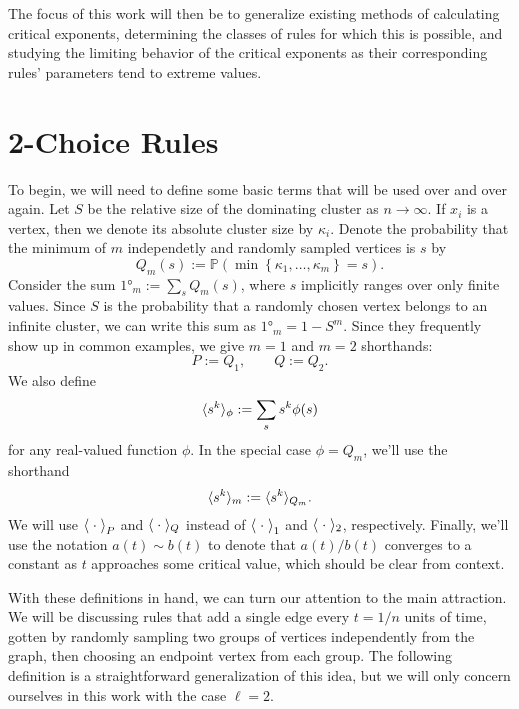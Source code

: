\documentclass[twoside,10pt]{article}
\begin{document}
The focus of this work will then be to generalize existing methods of calculating critical exponents, determining the classes of rules for which this is possible, and studying the limiting behavior of the critical exponents as their corresponding rules' parameters tend to extreme values.

\section{2-Choice Rules}

To begin, we will need to define some basic terms that will be used over and over again. Let $S$ be the relative size of the dominating cluster as $n \to \infty$. If $x_i$ is a vertex, then we denote its absolute cluster size by $\kappa_i$. Denote the probability that the minimum of $m$ independetly and randomly sampled vertices is $s$ by
\[
        Q_m(s) := \mathbb{P}\left( \min\left\{ \kappa_1, \dots, \kappa_m \right\} = s \right) .
\]
Consider the sum $\ang{1}_{m} := \sum_{s} Q_{m}(s)$, where $s$ implicitly ranges over only finite values. Since $S$ is the probability that a randomly chosen vertex belongs to an infinite cluster, we can write this sum as $\ang{1}_{m} = 1-S^{m}$. Since they frequently show up in common examples, we give $m=1$ and $m=2$ shorthands:
\[
        P := Q_1, \quad\quad Q := Q_2.
\]
We also define
\[
	\langle s^{k} \rangle_{\phi} := \sum_{s} s^{k} \phi(s)
\] 
for any real-valued function $\phi$. In the special case $\phi = Q_{m}$, we'll use the shorthand
\[
        \langle s^{k} \rangle_{m} := \langle s^{k} \rangle_{Q_{m}}.
\]
We will use $\left\langle \;\cdot\; \right\rangle_{P}$ and $\langle \;\cdot\; \rangle_{Q}$ instead of $\left\langle \;\cdot\; \right\rangle_{1}$ and $\langle \;\cdot\; \rangle_{2}$, respectively. Finally, we'll use the notation $a(t) \sim b(t)$ to denote that $a(t)/b(t)$ converges to a constant as $t$ approaches some critical value, which should be clear from context.

With these definitions in hand, we can turn our attention to the main attraction. We will be discussing rules that add a single edge every $t=1/n$ units of time, gotten by randomly sampling two groups of vertices independently from the graph, then choosing an endpoint vertex from each group. The following definition is a straightforward generalization of this idea, but we will only concern ourselves in this work with the case $\ell=2$.
\end{document}
